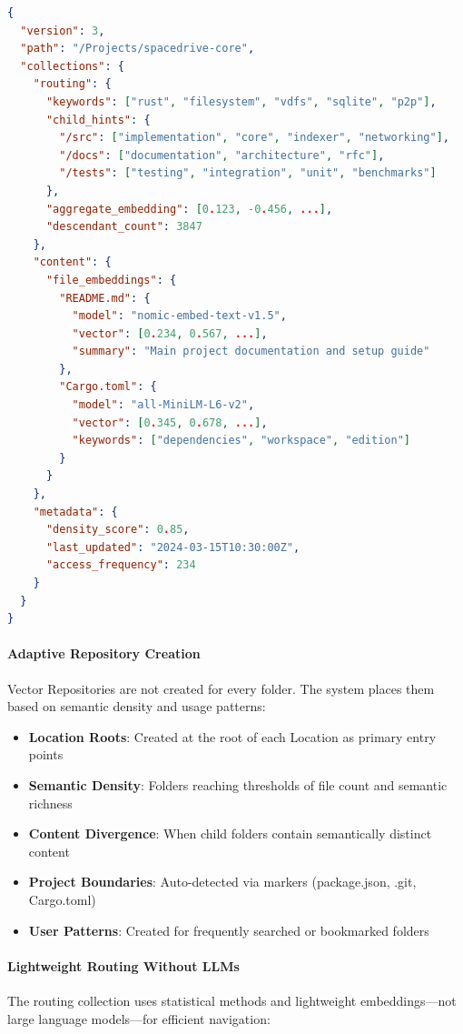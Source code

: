\documentclass[sigconf]{acmart}
\begin{document}
\begin{lstlisting}[language=json, caption=Example Vector Repository structure]
{
  "version": 3,
  "path": "/Projects/spacedrive-core",
  "collections": {
    "routing": {
      "keywords": ["rust", "filesystem", "vdfs", "sqlite", "p2p"],
      "child_hints": {
        "/src": ["implementation", "core", "indexer", "networking"],
        "/docs": ["documentation", "architecture", "rfc"],
        "/tests": ["testing", "integration", "unit", "benchmarks"]
      },
      "aggregate_embedding": [0.123, -0.456, ...],
      "descendant_count": 3847
    },
    "content": {
      "file_embeddings": {
        "README.md": {
          "model": "nomic-embed-text-v1.5",
          "vector": [0.234, 0.567, ...],
          "summary": "Main project documentation and setup guide"
        },
        "Cargo.toml": {
          "model": "all-MiniLM-L6-v2",
          "vector": [0.345, 0.678, ...],
          "keywords": ["dependencies", "workspace", "edition"]
        }
      }
    },
    "metadata": {
      "density_score": 0.85,
      "last_updated": "2024-03-15T10:30:00Z",
      "access_frequency": 234
    }
  }
}
\end{lstlisting}

\paragraph{Adaptive Repository Creation}
Vector Repositories are not created for every folder. The system places them based on semantic density and usage patterns:

\begin{itemize}
\item \textbf{Location Roots}: Created at the root of each Location as primary entry points
    \item \textbf{Semantic Density}: Folders reaching thresholds of file count and semantic richness
    \item \textbf{Content Divergence}: When child folders contain semantically distinct content
    \item \textbf{Project Boundaries}: Auto-detected via markers (package.json, .git, Cargo.toml)
    \item \textbf{User Patterns}: Created for frequently searched or bookmarked folders
\end{itemize}

\paragraph{Lightweight Routing Without LLMs}
The routing collection uses statistical methods and lightweight embeddings—not large language models—for efficient navigation:
\end{document}

